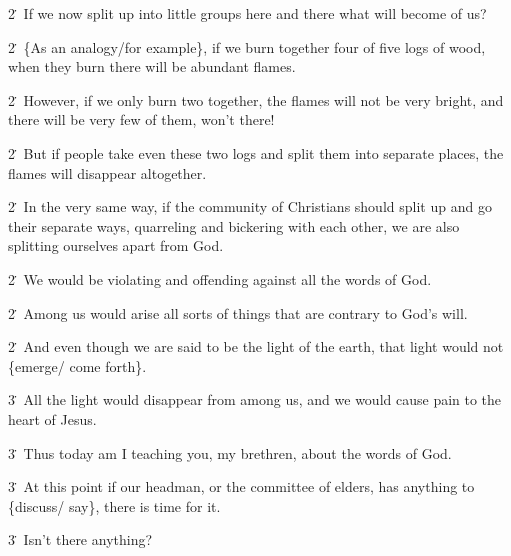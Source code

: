 2\. If we now split up into little groups here and there what will become of us?

2\. \{As an analogy/for example\}, if we burn together four of five logs of wood,
when they burn there will be abundant flames.

2\. However, if we only burn two together, the flames will not be very bright,
and there will be very few of them, won't there!

2\. But if people take even these two logs and split them into separate places,
the flames will disappear altogether.

2\. In the very same way, if the community of Christians should split up and go
their separate ways, quarreling and bickering with each other, we are also splitting
ourselves apart from God.

2\. We would be violating and offending against all the words of God.

2\. Among us would arise all sorts of things that are contrary to God's will.

2\. And even though we are said to be the light of the earth, that light would
not \{emerge/ come forth\}.

3\. All the light would disappear from among us, and we would cause pain to the
heart of Jesus.

3\. Thus today am I teaching you, my brethren, about the words of God.

3\. At this point if our headman, or the committee of elders, has anything to \{discuss/
say\}, there is time for it.

3\. Isn't there anything?

